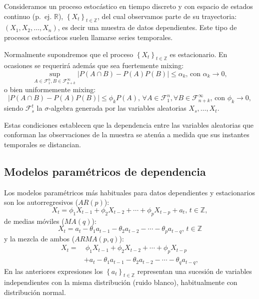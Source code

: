 \documentclass[
]{book}
\theoremstyle{break}
\theoremstyle{definition}
\theoremstyle{definition}
\theoremstyle{definition}
\theoremstyle{remark}
\begin{document}
Consideramos un proceso estocástico en tiempo discreto y con espacio de
estados continuo (p.~ej. \(\mathbb{R}\)), \(\left\{X_{t}\right\}_{t\in \mathbb{Z}}\),
del cual observamos parte de su trayectoria: \(\left( X_1,X_2,\ldots ,X_n \right)\),
es decir una muestra de datos dependientes.
Este tipo de procesos estocásticos suelen llamarse series temporales.

Normalmente supondremos que el proceso
\(\left\{ X_{t}\right\}_{t\in \mathbb{Z}}\) es estacionario.
En ocasiones se requerirá además que sea fuertemente mixing:
\[\sup_{A\in \mathcal{F}_1^{n},B\in \mathcal{F}_{n+k}^{\infty }}\left\vert
P\left( A\cap B \right) -P\left( A \right) P(B) \right\vert \leq
\alpha _{k}\text{, con }\alpha _{k}\rightarrow 0,\]
o bien uniformemente mixing:
\[\left\vert P\left( A\cap B \right) -P\left( A \right) P(B) \right\vert 
\leq \phi _{k}P\left( A \right) \text{, }\forall A\in \mathcal{F}_1^{n},
\forall B\in \mathcal{F}_{n+k}^{\infty }\text{, con }\phi_{k}\rightarrow 0,\]
siendo \(\mathcal{F}_{s}^{t}\) la \(\sigma\)-algebra generada por las variables aleatorias
\(X_{s},\ldots ,X_{t}\).

Estas condiciones establecen que la dependencia entre las variables
aleatorias que conforman las observaciones de la muestra se atenúa a
medida que sus instantes temporales se distancian.

\hypertarget{modelos-paramuxe9tricos-de-dependencia}{%
\subsection{Modelos paramétricos de dependencia}\label{modelos-paramuxe9tricos-de-dependencia}}

Los modelos paramétricos más habituales para datos dependientes y
estacionarios son los autorregresivos (\(AR\left( p \right)\)):
\[X_{t}=\phi _1X_{t-1}+\phi _2X_{t-2}+\cdots +\phi _{p}X_{t-p}+a_{t}
\text{, }t\in \mathbb{Z},\]
de medias móviles (\(MA\left( q \right)\)):
\[X_{t}=a_{t}-\theta _1a_{t-1}-\theta _2a_{t-2}-\cdots -\theta _{p}a_{t-q}
\text{, }t\in \mathbb{Z}\]
y la mezcla de ambos (\(ARMA\left( p,q \right)\)):
\[\begin{aligned}
X_{t} =&\ \phi _1X_{t-1}+\phi _2X_{t-2}+\cdots +\phi _{p}X_{t-p} \\
&+a_{t}-\theta _1a_{t-1}-\theta _2a_{t-2}-\cdots -\theta _{q}a_{t-q},\end{aligned}\]
En las anteriores expresiones los
\(\left\{ a_{t}\right\} _{t\in \mathbb{Z}}\) representan una sucesión de
variables independientes con la misma distribución (ruido blanco),
habitualmente con distribución normal.
\end{document}
